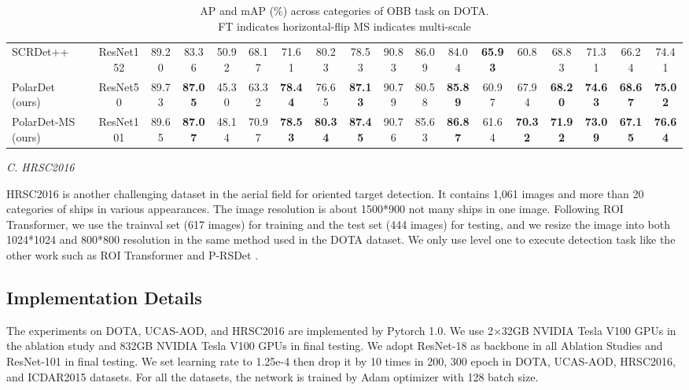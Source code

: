 \documentclass[10pt,twocolumn]{article}
\begin{document}
\begin{table*}[!tb]
{\begin{tabular}{l|c|c|c|c|c|c|c|c|c|c|c|c|c|c|c|c|c}
			SCRDet++ \cite{yang2020scrdet++} & ResNet152 & 89.20 & 83.36 & 50.92 & 68.17 & 71.61 & 80.23 & 78.53 & 90.83 & 86.09 & 84.04 & \textbf{65.93} & 60.8 & 68.83 & 71.31 & 66.24 & 74.41 \\
			PolarDet (ours) & ResNet50 & 89.73 & \textbf{87.05} & 45.30 & 63.32 & \textbf{78.44} & 76.65 & \textbf{87.13} & 90.79 & 80.58 & \textbf{85.89} & 60.97 & 67.94 & \textbf{68.20} & \textbf{74.63} & \textbf{68.67} & \textbf{75.02} \\
			PolarDet-MS (ours) & ResNet101 & 89.65 & \textbf{87.07} & 48.14 & 70.97 & \textbf{78.53} & \textbf{80.34} & \textbf{87.45} & 90.76 & 85.63 & \textbf{86.87} & 61.64 & \textbf{70.32} & \textbf{71.92} & \textbf{73.09} & \textbf{67.15} & \textbf{76.64} \\
			\hline
	\end{tabular}}
	\caption{AP and mAP (\%) across categories of OBB task on DOTA.\\FT indicates horizontal-flip MS indicates multi-scale}
	\label{DOTA result}
\end{table*}

\emph{C. HRSC2016}\label{HRSC2016}

HRSC2016 \cite{liu2016ship} is another challenging dataset in the aerial field for oriented target detection. It contains 1,061 images and more than 20 categories of ships in various appearances. The image resolution is about 1500*900 not many ships in one image. Following ROI Transformer, we use the trainval set (617 images) for training and the test set (444 images) for testing, and we resize the image into both 1024*1024 and 800*800 resolution in the same method used in the DOTA dataset. We only use level one to execute detection task like the other work such as ROI Transformer \cite{ding2019learning} and P-RSDet \cite{zhou2020objects}.

\subsection{Implementation Details}\label{Implementation_Details}
The experiments on DOTA, UCAS-AOD, and HRSC2016 are implemented by Pytorch 1.0. We use 2×32GB NVIDIA Tesla V100 GPUs in the ablation study and 832GB NVIDIA Tesla V100 GPUs in final testing. We adopt ResNet-18 as backbone in all Ablation Studies and ResNet-101 in final testing. We set learning rate to 1.25e-4 then drop it by 10 times in 200, 300 epoch in DOTA, UCAS-AOD, HRSC2016, and ICDAR2015 datasets. For all the datasets, the network is trained by Adam \cite{kingma2014adam} optimizer with 128 batch size.
\end{document}
